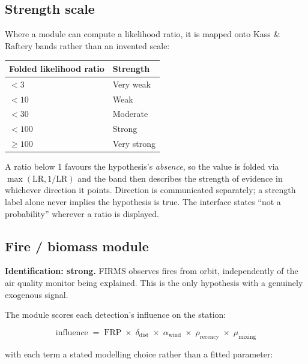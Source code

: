 \documentclass[11pt,a4paper]{article}
\begin{document}
\subsection{Strength scale}

Where a module can compute a likelihood ratio, it is mapped onto Kass \& Raftery
bands rather than an invented scale:

\begin{center}
\small
\begin{tabular}{@{}l l@{}}
\toprule
\textbf{Folded likelihood ratio} & \textbf{Strength} \\
\midrule
$< 3$ & Very weak \\
$< 10$ & Weak \\
$< 30$ & Moderate \\
$< 100$ & Strong \\
$\geq 100$ & Very strong \\
\bottomrule
\end{tabular}
\end{center}

A ratio below 1 favours the hypothesis's \emph{absence}, so the value is folded via
$\max(\mathrm{LR}, 1/\mathrm{LR})$ and the band then describes the strength of
evidence in whichever direction it points. Direction is communicated separately; a
strength label alone never implies the hypothesis is true. The interface states
``not a probability'' wherever a ratio is displayed.

\subsection{Fire / biomass module}

\textbf{Identification: strong.} FIRMS observes fires from orbit, independently of
the air quality monitor being explained. This is the only hypothesis with a genuinely
exogenous signal.

The module scores each detection's influence on the station:

\[
  \text{influence} \;=\; \mathrm{FRP} \;\times\; \delta_{\text{dist}}
  \;\times\; \alpha_{\text{wind}} \;\times\; \rho_{\text{recency}}
  \;\times\; \mu_{\text{mixing}}
\]

with each term a stated modelling choice rather than a fitted parameter:
\end{document}
